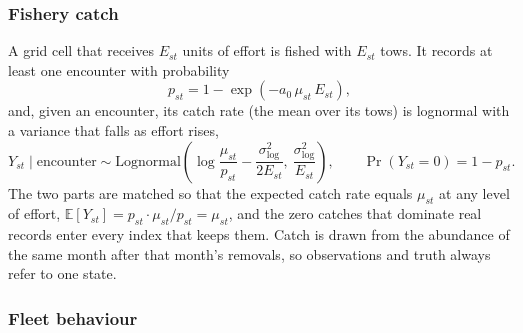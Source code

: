 \documentclass[11pt,a4paper]{article}
\newcommand{\vt}[1]{\text{#1}}
\begin{document}
\subsubsection{Fishery catch}

A grid cell that receives $E_{st}$ units of effort is fished with $E_{st}$ tows. It records at least one encounter with probability
\begin{equation}
p_{st} = 1-\exp(-a_0\,\mu_{st}\,E_{st}),
\label{eq:encounter}
\end{equation}
and, given an encounter, its catch rate (the mean over its tows) is lognormal with a variance that falls as effort rises,
\begin{equation}
Y_{st}\mid\vt{encounter} \sim \vt{Lognormal}\!\left(\log\frac{\mu_{st}}{p_{st}} - \frac{\sigma^2_{\log}}{2E_{st}},\ \frac{\sigma^2_{\log}}{E_{st}}\right), \qquad \Pr(Y_{st}=0) = 1-p_{st}.
\label{eq:catch}
\end{equation}
The two parts are matched so that the expected catch rate equals $\mu_{st}$ at any level of effort, $\mathbb{E}[Y_{st}] = p_{st}\cdot\mu_{st}/p_{st} = \mu_{st}$, and the zero catches that dominate real records enter every index that keeps them. Catch is drawn from the abundance of the same month after that month's removals, so observations and truth always refer to one state.

\subsubsection{Fleet behaviour}
\end{document}
